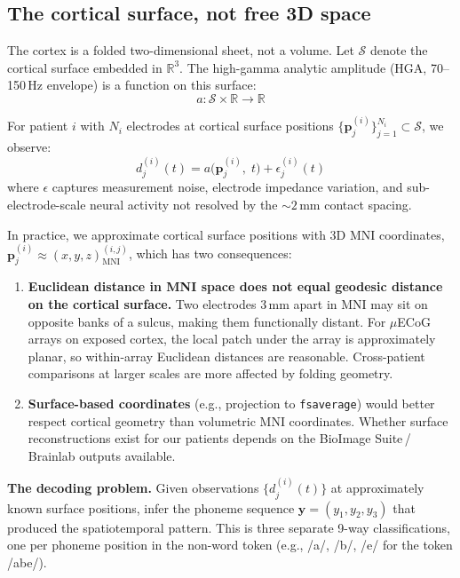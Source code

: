 \documentclass[11pt,letterpaper]{article}
\newcommand{\bfp}{\mathbf{p}}
\newcommand{\bfy}{\mathbf{y}}
\newcommand{\cS}{\mathcal{S}}
\newcommand{\R}{\mathbb{R}}
\begin{document}
\subsection{The cortical surface, not free 3D space}

The cortex is a folded two-dimensional sheet, not a volume. Let $\cS$ denote the cortical surface embedded in $\R^3$. The high-gamma analytic amplitude (HGA, 70--150\,Hz envelope) is a function on this surface:
\begin{equation}
a: \cS \times \R \to \R
\end{equation}

For patient $i$ with $N_i$ electrodes at cortical surface positions $\{\bfp_j^{(i)}\}_{j=1}^{N_i} \subset \cS$, we observe:
\begin{equation}\label{eq:observation}
\boxed{d_j^{(i)}(t) = a\bigl(\bfp_j^{(i)},\; t\bigr) + \epsilon_j^{(i)}(t)}
\end{equation}
where $\epsilon$ captures measurement noise, electrode impedance variation, and sub-electrode-scale neural activity not resolved by the ${\sim}2$\,mm contact spacing.

In practice, we approximate cortical surface positions with 3D MNI coordinates,
$\bfp_j^{(i)} \approx (x, y, z)_{\text{MNI}}^{(i,j)}$,
which has two consequences:

\begin{enumerate}[leftmargin=2em]
\item \textbf{Euclidean distance in MNI space does not equal geodesic distance on the cortical surface.} Two electrodes 3\,mm apart in MNI may sit on opposite banks of a sulcus, making them functionally distant. For $\mu$ECoG arrays on exposed cortex, the local patch under the array is approximately planar, so within-array Euclidean distances are reasonable. Cross-patient comparisons at larger scales are more affected by folding geometry.

\item \textbf{Surface-based coordinates} (e.g., projection to \texttt{fsaverage}) would better respect cortical geometry than volumetric MNI coordinates. Whether surface reconstructions exist for our patients depends on the BioImage Suite\,/\,Brainlab outputs available.
\end{enumerate}

\textbf{The decoding problem.} Given observations $\{d_j^{(i)}(t)\}$ at approximately known surface positions, infer the phoneme sequence $\bfy = (y_1, y_2, y_3)$ that produced the spatiotemporal pattern.
This is three separate 9-way classifications, one per phoneme position in the non-word token (e.g., /a/, /b/, /e/ for the token /abe/).
\end{document}
